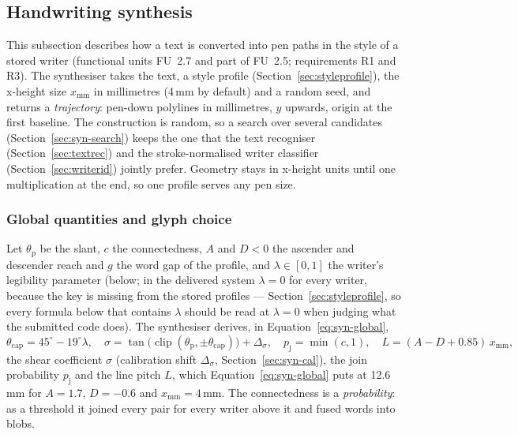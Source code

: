 \subsection{Handwriting synthesis}
\label{sec:synthesis}

This subsection describes how a text is converted into pen paths in the style of a stored writer (functional units FU~2.7 and part of FU~2.5; requirements R1 and R3).
The synthesiser takes the text, a style profile (Section~\ref{sec:styleprofile}), the x-height size $x_{\mathrm{mm}}$ in millimetres (4\,mm by default) and a random seed, and returns a \emph{trajectory}: pen-down polylines in millimetres, $y$ upwards, origin at the first baseline.
The construction is random, so a search over several candidates (Section~\ref{sec:syn-search}) keeps the one that the text recogniser (Section~\ref{sec:textrec}) and the stroke-normalised writer classifier (Section~\ref{sec:writerid}) jointly prefer.
Geometry stays in x-height units until one multiplication at the end, so one profile serves any pen size.

\subsubsection{Global quantities and glyph choice}

Let $\theta_{\mathrm p}$ be the slant, $c$ the connectedness, $A$ and $D<0$ the ascender and descender reach and $g$ the word gap of the profile, and $\lambda\in[0,1]$ the writer's legibility parameter (below; in the delivered system $\lambda=0$ for every writer, because the key is missing from the stored profiles --- Section~\ref{sec:styleprofile}, so every formula below that contains $\lambda$ should be read at $\lambda=0$ when judging what the submitted code does).
The synthesiser derives, in Equation~\ref{eq:syn-global},
\begin{equation}
\theta_{\mathrm{cap}}=45^\circ-19^\circ\lambda,\quad\sigma=\tan\!\bigl(\operatorname{clip}(\theta_{\mathrm p},\pm\theta_{\mathrm{cap}})\bigr)+\Delta_\sigma,\quad p_{\mathrm j}=\min(c,1),\quad L=(A-D+0.85)\,x_{\mathrm{mm}},
\label{eq:syn-global}
\end{equation}
the shear coefficient $\sigma$ (calibration shift $\Delta_\sigma$, Section~\ref{sec:syn-cal}), the join probability $p_{\mathrm j}$ and the line pitch $L$, which Equation~\ref{eq:syn-global} puts at 12.6\,mm for $A=1.7$, $D=-0.6$ and $x_{\mathrm{mm}}=4$\,mm.
The connectedness is a \emph{probability}: as a threshold it joined every pair for every writer above it and fused words into blobs.

